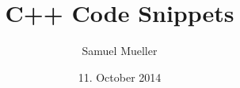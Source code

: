 \documentclass{article}
\newcommand{\includeChapter}[1] {
  \newpage
  
}
\begin{document}
  \title{C++ Code Snippets}
  \date{11. October 2014}
  \author{Samuel Mueller}
  \maketitle

  \newpage

  \tableofcontents
  \newpage

  \includeChapter{terminology}

  \includeChapter{basic_concepts}

  \includeChapter{classes}

  \includeChapter{immutability}

  \includeChapter{streams}

  \includeChapter{iterators}

  \includeChapter{containers}

  \includeChapter{algorithms}

  \includeChapter{bind}

  \includeChapter{templates}

  \includeChapter{references_and_pointers}

  \includeChapter{compile_time_calculation}

  \includeChapter{good_to_know}

  \includeChapter{appendix}
\end{document}
